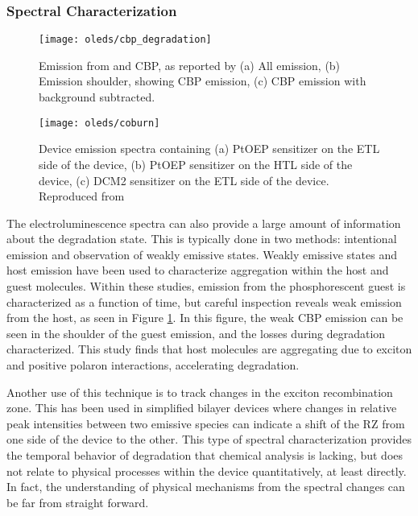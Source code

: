 \documentclass[../thesis.tex]{subfiles}
\begin{document}
\subsubsection{Spectral Characterization}

\begin{figure}[ht]
\centering
\texttt{[image: oleds/cbp\_degradation]}
\caption{Emission from \irppy and CBP, as reported by \textcite{Zhang2016} (a) All emission, (b) Emission shoulder, showing CBP emission, (c) CBP emission with \irppy background subtracted.}
\label{fig:oleds_cbp}
\end{figure}

\begin{wrapfigure}{r}{.5\textwidth}
\centering
\texttt{[image: oleds/coburn]}
\caption{Device emission spectra containing (a) PtOEP sensitizer on the ETL side of the device, (b) PtOEP sensitizer on the HTL side of the device, (c) DCM2 sensitizer on the ETL side of the device.  Reproduced from \textcite{Coburn2017}}
\label{fig:oleds_coburn}
\vspace{-20pt}
\end{wrapfigure}

The electroluminescence spectra can also provide a large amount of information about the degradation state.\supercite{Scholz2015}
This is typically done in two methods:  intentional emission and observation of weakly emissive states.
Weakly emissive states and host emission have been used to characterize aggregation within the host and guest molecules.\supercite{Zhang2016,Wang2015a,Wang2014,Yu2017}
Within these studies, emission from the phosphorescent guest is characterized as a function of time, but careful inspection reveals weak emission from the host, as seen in Figure \ref{fig:oleds_cbp}.\supercite{Zhang2016}
In this figure, the weak CBP emission can be seen in the shoulder of the guest emission, and the losses during degradation characterized.
This study finds that host molecules are aggregating due to exciton and positive polaron interactions, accelerating degradation.

Another use of this technique is to track changes in the exciton recombination zone.  
This has been used in simplified bilayer devices where changes in relative peak intensities between two emissive species can indicate a shift of the RZ from one side of the device to the other.\supercite{Yu2017,Wang2010a}
This type of spectral characterization provides the temporal behavior of degradation that chemical analysis is lacking, but does not relate to physical processes within the device quantitatively, at least directly.
In fact, the understanding of physical mechanisms from the spectral changes can be far from straight forward.
\end{document}
